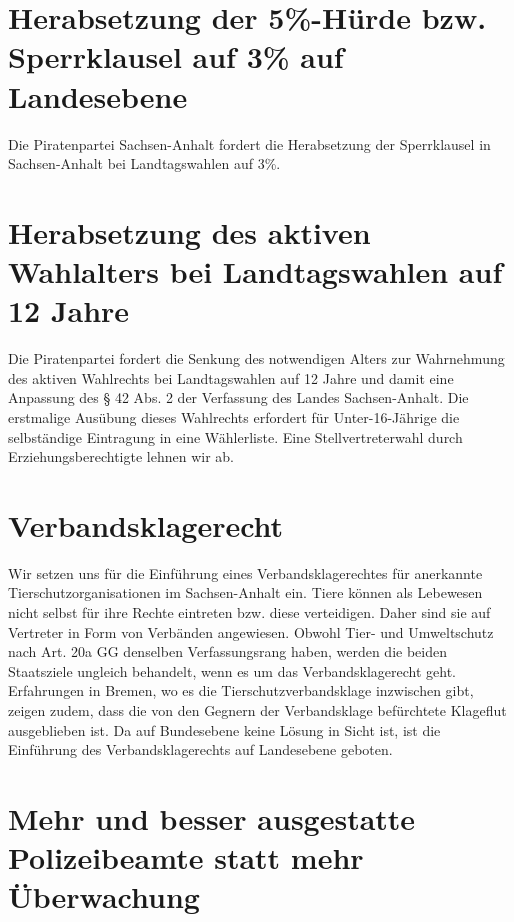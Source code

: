 \section{Herabsetzung der 5\%-Hürde bzw. Sperrklausel auf 3\% auf Landesebene}

Die Piratenpartei Sachsen-Anhalt fordert die Herabsetzung der Sperrklausel
in Sachsen-Anhalt bei Landtagswahlen auf 3\%. 

\section{Herabsetzung des aktiven Wahlalters bei Landtagswahlen auf 12 Jahre}

Die Piratenpartei fordert die Senkung des notwendigen Alters zur Wahrnehmung des
aktiven Wahlrechts bei Landtagswahlen auf 12 Jahre und damit eine Anpassung des
§ 42 Abs. 2 der Verfassung des Landes Sachsen-Anhalt. Die erstmalige Ausübung
dieses Wahlrechts erfordert für Unter-16-Jährige die selbständige Eintragung in
eine Wählerliste. Eine Stellvertreterwahl durch Erziehungsberechtigte lehnen wir
ab.

\section{Verbandsklagerecht}

Wir setzen uns für die Einführung eines Verbandsklagerechtes für anerkannte
Tierschutzorganisationen im Sachsen-Anhalt ein. Tiere können als Lebewesen nicht
selbst für ihre Rechte eintreten bzw. diese verteidigen. Daher sind sie auf
Vertreter in Form von Verbänden angewiesen. Obwohl Tier- und Umweltschutz nach
Art. 20a GG denselben Verfassungsrang haben, werden die beiden Staatsziele
ungleich behandelt, wenn es um das Verbandsklagerecht geht. Erfahrungen in
Bremen, wo es die Tierschutzverbandsklage inzwischen gibt, zeigen zudem, dass
die von den Gegnern der Verbandsklage befürchtete Klageflut ausgeblieben ist. Da
auf Bundesebene keine Lösung in Sicht ist, ist die Einführung des
Verbandsklagerechts auf Landesebene geboten.

\section{Mehr und besser ausgestatte Polizeibeamte statt mehr Überwachung}

